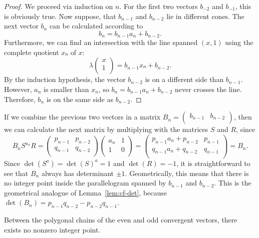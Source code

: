 \begin{proof}
  We proceed via induction on $n$.
  For the first two vectors $b_{-2}$ and $b_{-1}$, this is obviously true.
  Now suppose, that $b_{n-1}$ and $b_{n-2}$ lie in different cones.
  The next vector $b_n$ can be calculated according to
  \[
    b_n = b_{n-1} a_n + b_{n-2}.
  \]
  Furthermore, we can find an intersection with the line spanned $(x, 1)$ using
  the complete quotient $xₙ$ of $x$:
  \[
    λ
    \begin{pmatrix}
      x \\
      1 \\
    \end{pmatrix}
    = b_{n-1} xₙ + b_{n-2}.
  \]
  By the induction hypothesis, the vector $b_{n-2}$ is on a different side than $b_{n-1}$.
  However, $a_n$ is smaller than $x_n$, so $b_n = b_{n-1} a_n + b_{n-2}$ never crosses the line.
  Therefore, $b_n$ is on the same side as $b_{n-2}$.
\end{proof}

If we combine the previous two vectors in a matrix $B_n = \begin{pmatrix}
  b_{n-1} & b_{n-2} \\
\end{pmatrix}$,
then we can calculate the next matrix by multiplying with the matrices $S$ and $R$, since
\[
  B_n S^{a_n} R =
  \begin{pmatrix}
    p_{n-1} & p_{n-2} \\
    q_{n-1} & q_{n-2} \\
  \end{pmatrix}
  \begin{pmatrix}
    a_n & 1 \\
    1   & 0 \\
  \end{pmatrix}
  =
  \begin{pmatrix}
    p_{n-1} a_n + p_{n-2} & p_{n-1} \\
    q_{n-1} a_n + q_{n-2} & q_{n-1} \\
  \end{pmatrix}
  =
  B_n.
\]
Since $\det(S^a) = \det(S)^a = 1$ and $\det(R) = -1$, it is straightforward to
see that $B_n$ always has determinant $±1$.
Geometrically, this means that there is no integer point inside the
parallelogram spanned by $b_{n-1}$ and $b_{n-2}$.
This is the geometrical analogue of Lemma~\ref{lem:cf-det},
because $\det(B_n) = p_{n-1} q_{n-2} - p_{n-2} q_{n-1}$.

\begin{lemma}
  \label{lem:klein-empty}
  Between the polygonal chains of the even and odd convergent vectors,
  there exists no nonzero integer point.
\end{lemma}

